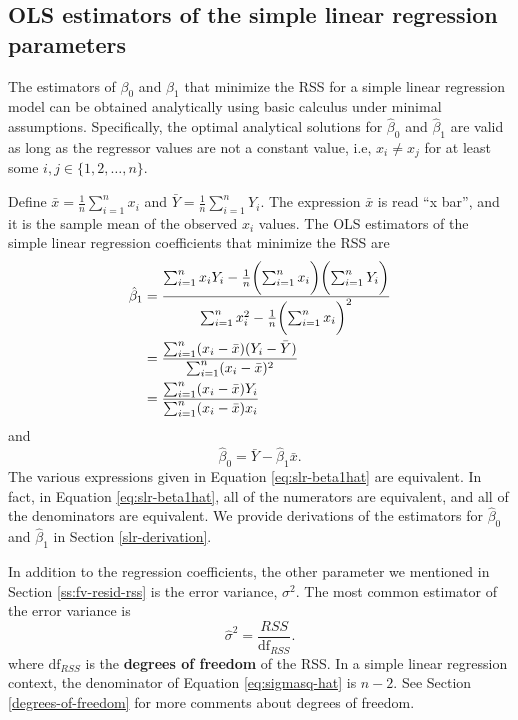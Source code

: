 \documentclass[
]{book}
\theoremstyle{definition}
\theoremstyle{definition}
\theoremstyle{definition}
\theoremstyle{definition}
\theoremstyle{remark}
\begin{document}
\hypertarget{ols-estimators-of-the-simple-linear-regression-parameters}{%
\subsection{OLS estimators of the simple linear regression parameters}\label{ols-estimators-of-the-simple-linear-regression-parameters}}

The estimators of \(\beta_0\) and \(\beta_1\) that minimize the RSS for a simple linear regression model can be obtained analytically using basic calculus under minimal assumptions. Specifically, the optimal analytical solutions for \(\hat{\beta}_0\) and \(\hat{\beta}_1\) are valid as long as the regressor values are not a constant value, i.e, \(x_i \neq x_j\) for at least some \(i,j\in \{1,2,\ldots,n\}\).

Define \(\bar{x}=\frac{1}{n}\sum_{i=1}^n x_i\) and
\(\bar{Y} = \frac{1}{n}\sum_{i=1}^n Y_i\). The expression \(\bar{x}\) is read ``x bar'', and it is the sample mean of the observed \(x_i\) values. The OLS estimators of the simple linear regression coefficients that minimize the RSS are
\[
\begin{aligned}
\hat{\beta}_1 &= \frac{\sum_{i=1}^n x_i Y_i - \frac{1}{n} \biggl(\sum_{i=1}^n x_i\biggr)\biggl(\sum_{i=1}^n Y_i\biggr)}{\sum_{i=1}^n x_i^2 - \frac{1}{n} \biggl(\sum_{i=1}^n x_i\biggr)^2} \notag \\
&= \frac{\sum_{i=1}^n (x_i - \bar{x})(Y_i - \bar{Y})}{\sum_{i=1}^n (x_i - \bar{x})^2} \notag \\
&= \frac{\sum_{i=1}^n (x_i - \bar{x})Y_i}{\sum_{i=1}^n (x_i - \bar{x})x_i}
\end{aligned}
\label{eq:slr-beta1hat}
\]
and
\[
\hat{\beta}_0 = \bar{Y} - \hat{\beta}_1 \bar{x}. \label{eq:slr-beta0hat}
\]
The various expressions given in Equation \eqref{eq:slr-beta1hat} are equivalent. In fact, in Equation \eqref{eq:slr-beta1hat}, all of the numerators are equivalent, and all of the denominators are equivalent. We provide derivations of the estimators for \(\hat{\beta}_0\) and \(\hat{\beta}_1\) in Section \ref{slr-derivation}.

In addition to the regression coefficients, the other parameter we mentioned in Section \ref{ss:fv-resid-rss} is the error variance, \(\sigma^2\). The most common estimator of the error variance is
\[
\hat{\sigma}^2 = \frac{RSS}{\mathrm{df}_{RSS}}. \label{eq:sigmasq-hat}
\]
where \(\mathrm{df}_{RSS}\) is the \textbf{degrees of freedom} of the RSS. In a simple linear regression context, the denominator of Equation \eqref{eq:sigmasq-hat} is \(n-2\). See Section \ref{degrees-of-freedom} for more comments about degrees of freedom.
\end{document}
